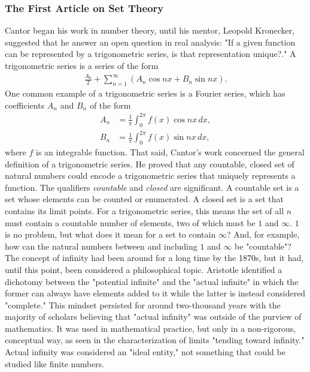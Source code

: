 
\subsubsection{The First Article on Set Theory}

Cantor began his work in number theory, until his mentor, Leopold Kronecker, suggested that he answer an open question in real analysis: "If a given function can be represented by a trigonometric series, is that representation unique?." A trigonometric series is a series of the form
\begin{align*}
\frac{A_0}{2}+\sum_{n=1}^{\infty}(A_n\cos nx + B_n\sin nx).
\end{align*}
One common example of a trigonometric series is a Fourier series, which has coefficients $A_n$ and $B_n$ of the form
\begin{align*}
A_n&=\frac{1}{\pi}\int_{0}^{2\pi}f(x)\cos nx\,dx, \\[1mm]
B_n&=\frac{1}{\pi}\int_{0}^{2\pi}f(x)\sin nx\,dx,
\end{align*}
where $f$ is an integrable function. That said, Cantor's work concerned the general definition of a trigonometric series. He proved that any countable, closed set of natural numbers could encode a trigonometric series that uniquely represents a function. The qualifiers \textit{countable} and \textit{closed} are significant. A countable set is a set whose elements can be counted or enumerated. A closed set is a set that contains its limit points. For a trigonometric series, this means the set of all $n$ must contain a countable number of elements, two of which must be $1$ and $\infty$. $1$ is no problem, but what does it mean for a set to contain $\infty$? And, for example, how can the natural numbers between and including $1$ and $\infty$ be "countable"? \\

The concept of infinity had been around for a long time by the 1870s, but it had, until this point, been considered a philosophical topic. Aristotle identified a dichotomy between the "potential infinite" and the "actual infinite" in which the former can always have elements added to it while the latter is instead considered "complete." This mindset persisted for around two-thousand years with the majority of scholars believing that "actual infinity" was outside of the purview of mathematics. It was used in mathematical practice, but only in a non-rigorous, conceptual way, as seen in the characterization of limits "tending toward infinity." Actual infinity was considered an "ideal entity," not something that could be studied like finite numbers. \\

